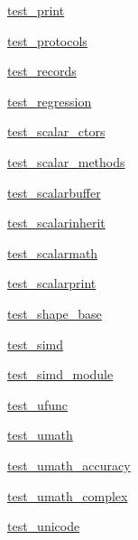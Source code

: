 \begin{DoxyCompactItemize}
\item 
 \hyperlink{namespacenumpy_1_1core_1_1tests_1_1test__print}{test\+\_\+print}
\item 
 \hyperlink{namespacenumpy_1_1core_1_1tests_1_1test__protocols}{test\+\_\+protocols}
\item 
 \hyperlink{namespacenumpy_1_1core_1_1tests_1_1test__records}{test\+\_\+records}
\item 
 \hyperlink{namespacenumpy_1_1core_1_1tests_1_1test__regression}{test\+\_\+regression}
\item 
 \hyperlink{namespacenumpy_1_1core_1_1tests_1_1test__scalar__ctors}{test\+\_\+scalar\+\_\+ctors}
\item 
 \hyperlink{namespacenumpy_1_1core_1_1tests_1_1test__scalar__methods}{test\+\_\+scalar\+\_\+methods}
\item 
 \hyperlink{namespacenumpy_1_1core_1_1tests_1_1test__scalarbuffer}{test\+\_\+scalarbuffer}
\item 
 \hyperlink{namespacenumpy_1_1core_1_1tests_1_1test__scalarinherit}{test\+\_\+scalarinherit}
\item 
 \hyperlink{namespacenumpy_1_1core_1_1tests_1_1test__scalarmath}{test\+\_\+scalarmath}
\item 
 \hyperlink{namespacenumpy_1_1core_1_1tests_1_1test__scalarprint}{test\+\_\+scalarprint}
\item 
 \hyperlink{namespacenumpy_1_1core_1_1tests_1_1test__shape__base}{test\+\_\+shape\+\_\+base}
\item 
 \hyperlink{namespacenumpy_1_1core_1_1tests_1_1test__simd}{test\+\_\+simd}
\item 
 \hyperlink{namespacenumpy_1_1core_1_1tests_1_1test__simd__module}{test\+\_\+simd\+\_\+module}
\item 
 \hyperlink{namespacenumpy_1_1core_1_1tests_1_1test__ufunc}{test\+\_\+ufunc}
\item 
 \hyperlink{namespacenumpy_1_1core_1_1tests_1_1test__umath}{test\+\_\+umath}
\item 
 \hyperlink{namespacenumpy_1_1core_1_1tests_1_1test__umath__accuracy}{test\+\_\+umath\+\_\+accuracy}
\item 
 \hyperlink{namespacenumpy_1_1core_1_1tests_1_1test__umath__complex}{test\+\_\+umath\+\_\+complex}
\item 
 \hyperlink{namespacenumpy_1_1core_1_1tests_1_1test__unicode}{test\+\_\+unicode}
\end{DoxyCompactItemize}
